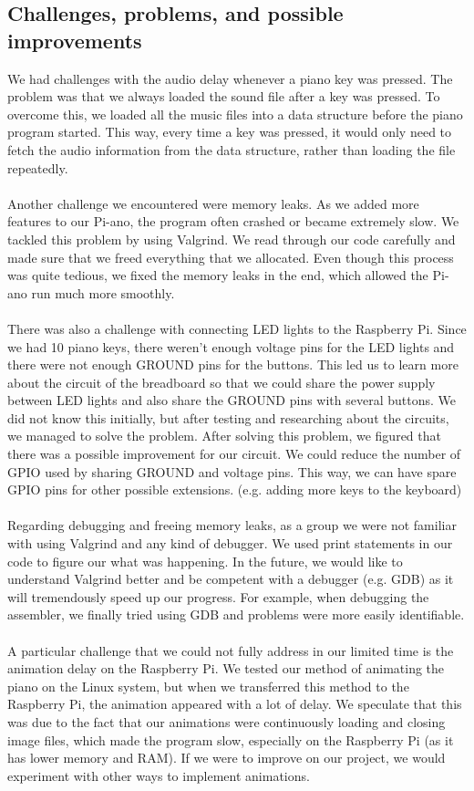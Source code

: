 \documentclass[11pt]{article}
\begin{document}
\subsection{Challenges, problems, and possible improvements}
We had challenges with the audio delay whenever a piano key was pressed. The problem was that we always loaded the sound file after a key was pressed. To overcome this, we loaded all the music files into a data structure before the piano program started. This way, every time a key was pressed, it would only need to fetch the audio information from the data structure, rather than loading the file repeatedly. 
\\
\\
Another challenge we encountered were memory leaks. As we added more features to our Pi-ano, the program often crashed or became extremely slow. We tackled this problem by using Valgrind. We read through our code carefully and made sure that we freed everything that we allocated. Even though this process was quite tedious, we fixed the memory leaks in the end, which allowed the Pi-ano run much more smoothly.
\\
\\
There was also a challenge with connecting LED lights to the Raspberry Pi. Since we had 10 piano keys, there weren't enough voltage pins for the LED lights and there were not enough GROUND pins for the buttons. This led us to learn more about the circuit of the breadboard so that we could share the power supply between LED lights and also share the GROUND pins with several buttons. We did not know this initially, but after testing and researching about the circuits, we managed to solve the problem. After solving this problem, we figured that there was a possible improvement for our circuit. We could reduce the number of GPIO used by sharing GROUND and voltage pins. This way, we can have spare GPIO pins for other possible extensions. (e.g. adding more keys to the keyboard)
\\
\\
Regarding debugging and freeing memory leaks, as a group we were not familiar with using Valgrind and any kind of debugger. We used print statements in our code to figure our what was happening. In the future, we would like to understand Valgrind better and be competent with a debugger (e.g. GDB) as it will tremendously speed up our progress. For example, when debugging the assembler, we finally tried using GDB and problems were more easily identifiable.
\\
\\
A particular challenge that we could not fully address in our limited time is the animation delay on the Raspberry Pi. We tested our method of animating the piano on the Linux system, but when we transferred this method to the Raspberry Pi, the animation appeared with a lot of delay. We speculate that this was due to the fact that our animations were continuously loading and closing image files, which made the program slow, especially on the Raspberry Pi (as it has lower memory and RAM). If we were to improve on our project, we would experiment with other ways to implement animations.
\end{document}

